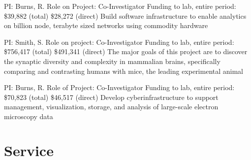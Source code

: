 \documentclass[10pt,colorlinks=true,urlcolor=blue]{moderncv}
\begin{document}
{\newline PI: Burns, R.
\newline Role on Project: Co-Investigator
\newline Funding to lab, entire period: \$39,882 (total) \$28,272 (direct)
\newline Build software infrastructure to enable analytics on billion node, terabyte sized networks
using commodity hardware}{}{}{}

{\newline PI: Smith, S.
\newline Role on project: Co-Investigator
\newline Funding to lab, entire period: \$756,417 (total) \$491,341 (direct)
\newline The major goals of this project are to discover the synaptic diversity and complexity in
mammalian brains, specifically comparing and contrasting humans with mice, the leading
experimental animal}{}{}{}

{\newline PI: Burns, R.
\newline Role of Project: Co-Investigator
\newline Funding to lab, entire period: \$70,823 (total) \$46,517 (direct)
\newline Develop cyberinfrastructure to support management, visualization, storage, and analysis
of large-scale electron microscopy data}{}{}{}{}



\section{Service}
\end{document}
